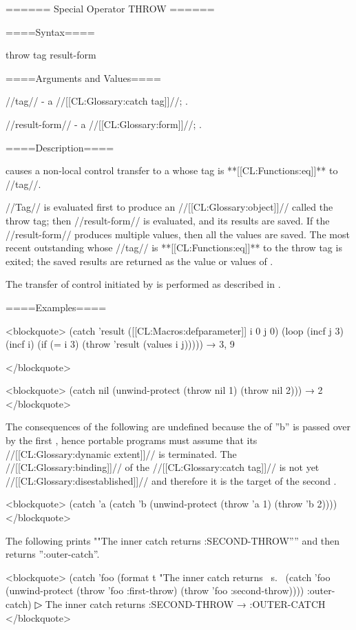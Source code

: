 ====== Special Operator THROW ======

====Syntax====

\DefspecNoReturn throw {tag result-form}

====Arguments and Values====

//tag// - a //[[CL:Glossary:catch tag]]//; \eval.

//result-form// - a //[[CL:Glossary:form]]//; \evalspecial.

====Description====

 causes a non-local control transfer to a  whose tag is **[[CL:Functions:eq]]** to //tag//.

//Tag// is evaluated first to produce an //[[CL:Glossary:object]]// called the throw tag; then //result-form// is evaluated, and its results are saved. If the //result-form// produces multiple values, then all the values are saved. The most recent outstanding  whose //tag// is **[[CL:Functions:eq]]** to the throw tag is exited; the saved results are returned as the value or values of .

The transfer of control initiated by  is performed as described in \secref\TransferOfControl.

====Examples====

<blockquote> (catch 'result ([[CL:Macros:defparameter]] i 0 j 0) (loop (incf j 3) (incf i) (if (= i 3) (throw 'result (values i j))))) → 3, 9

</blockquote>

<blockquote> (catch nil (unwind-protect (throw nil 1) (throw nil 2))) → 2 </blockquote>

The consequences of the following are undefined because the  of ''b'' is passed over by the first , hence portable programs must assume that its //[[CL:Glossary:dynamic extent]]// is terminated. The //[[CL:Glossary:binding]]// of the //[[CL:Glossary:catch tag]]// is not yet //[[CL:Glossary:disestablished]]// and therefore it is the target of the second .

<blockquote> (catch 'a (catch 'b (unwind-protect (throw 'a 1) (throw 'b 2)))) </blockquote>

The following prints ""The inner catch returns :SECOND-THROW'''' and then returns '':outer-catch''.

<blockquote> (catch 'foo (format t "The inner catch returns ~s.~ (catch 'foo (unwind-protect (throw 'foo :first-throw) (throw 'foo :second-throw)))) :outer-catch)
▷ The inner catch returns :SECOND-THROW → :OUTER-CATCH </blockquote>


